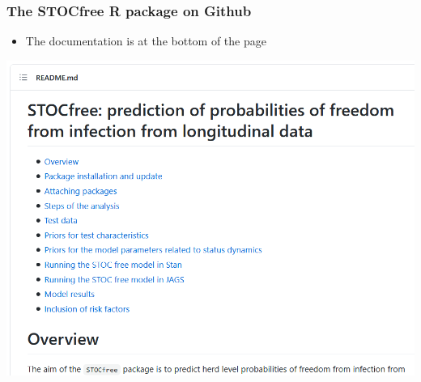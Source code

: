 \documentclass{beamer}
\begin{document}
\begin{frame}
\frametitle{The STOCfree R package on Github}
\begin{itemize}
 \item{The documentation is at the bottom of the page}
\end{itemize}
\includegraphics[width=.9\textwidth]{imgs/STOCfree_Github_1.png}
\end{frame}

{
    \begin{frame}[plain]
    \end{frame}
    }
\end{document}
